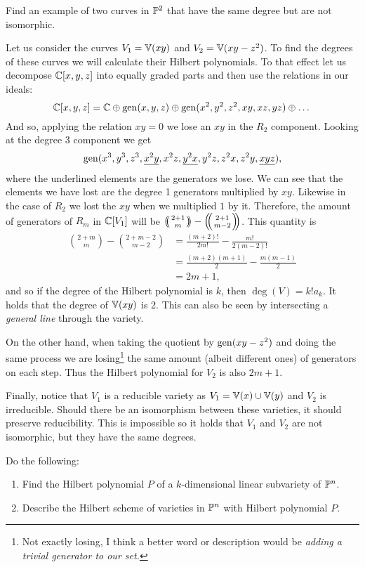 \documentclass[12pt]{memoir}
\begin{document}
\begin{Ej}
	Find an example of two curves in $\mathbb{P}^2$ that have the same
	degree but are not isomorphic.
\end{Ej}

\begin{ptcbr}
Let us consider the curves $V_1=\mathbb{V}(xy)$ and $V_2=\mathbb{V}(xy-z^2)$. To find the degrees of these curves we will calculate their Hilbert polynomials. To that effect let us decompose $\mathbb{C}[x,y,z]$ into equally graded parts and then use the relations in our ideals:
$$\mathbb{C}[x,y,z]=\mathbb{C}\oplus \operatorname{gen}(x,y,z)\oplus\operatorname{gen}(x^2,y^2,z^2,xy,xz,yz)\oplus\dots$$
And so, applying the relation $xy=0$ we lose an $xy$ in the $R_2$ component. Looking at the degree 3 component we get 
$$\operatorname{gen}(x^3,y^3,z^3,\underline{x^2y},x^2z,\underline{y^2x},y^2z,z^2x,z^2y,\underline{xyz}),$$
where the underlined elements are the generators we lose. We can see that the elements we have lost are the degree 1 generators multiplied by $xy$. Likewise in the case of $R_2$ we lost the $xy$ when we multiplied $1$ by it. Therefore, the amount of generators of $R_m$ in $\mathbb{C}[V_1]$ will be $\multinom{2+1}{m}-\multinom{2+1}{m-2}$. This quantity is 
\begin{align*}
	\binom{2+m}{m}-\binom{2+m-2}{m-2}&=\frac{(m+2)!}{2m!}-\frac{m!}{2(m-2)!}\\
	&=\frac{(m+2)(m+1)}{2}-\frac{m(m-1)}{2}\\
	&=2m+1,
\end{align*}
and so if the degree of the Hilbert polynomial is $k$, then $\deg(V)=k!a_k$. It holds that the degree of $\mathbb{V}(xy)$ is 2. This can also be seen by intersecting a \emph{general line} through the variety.\par 
On the other hand, when taking the quotient by $\operatorname{gen}(xy-z^2)$ and doing the same process we are losing\footnote{Not exactly losing, I think a better word or description would be \emph{adding a trivial generator to our set.}} the same amount (albeit different ones) of generators on each step. Thus the Hilbert polynomial for $V_2$ is also $2m+1$.\par 
Finally, notice that $V_1$ is a reducible variety as $V_1=\mathbb{V}(x)\cup\mathbb{V}(y)$ and $V_2$ is irreducible. Should there be an isomorphism between these varieties, it should preserve reducibility. This is impossible so it holds that $V_1$ and $V_2$ are not isomorphic, but they have the same degrees.
\end{ptcbr}

\begin{Ej}
	Do the following:
	\begin{enumerate}
		\item Find the Hilbert polynomial $P$ of a $k$-dimensional linear
		      subvariety of $\mathbb{P}^n$.
		\item  Describe the Hilbert scheme of varieties in $\mathbb{P}^n$ with Hilbert
		      polynomial $P$.
	\end{enumerate}

\end{Ej}
\end{document}
